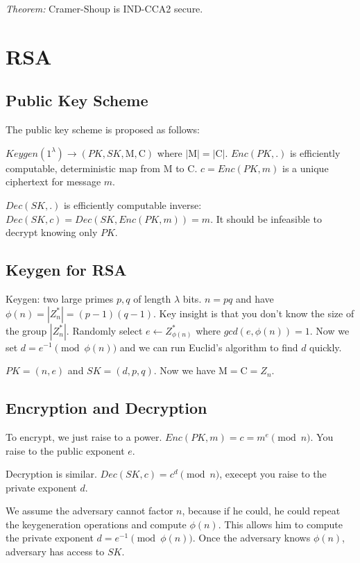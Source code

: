 \documentclass[psamsfonts]{amsart}
\begin{document}
\emph{Theorem:} Cramer-Shoup is IND-CCA2 secure.

\section{RSA}

\subsection{Public Key Scheme}

The public key scheme is proposed as follows:

$Keygen(1^\lambda) \to (PK, SK, \mathrm{M}, \mathrm{C})$ where $|\mathrm{M}| = |\mathrm{C}|$. $Enc(PK, .)$ is efficiently computable, deterministic map from $\mathrm{M}$ to $\mathrm{C}$. $c = Enc(PK, m)$ is a unique ciphertext for message $m$.

$Dec(SK,.)$ is efficiently computable inverse: $Dec(SK, c) = Dec(SK, Enc(PK, m)) = m$. It should be infeasible to decrypt knowing only $PK$. 

\subsection{Keygen for RSA}

Keygen: two large primes $p,q$ of length $\lambda$ bits. $n = pq$ and have $\phi(n) = |Z_n^*| = (p-1) (q-1)$. Key insight is that you don't know the size of the group $|Z_n^*|$. Randomly select $e \leftarrow Z_{\phi(n)}^*$ where $gcd(e, \phi(n)) = 1$. Now we set $d = e^{-1} \pmod{ \phi(n)}$ and we can run Euclid's algorithm to find $d$ quickly.

$PK = (n,e)$ and $SK = (d, p, q)$. Now we have $\mathrm{M} = \mathrm{C} = Z_n$.

\subsection{Encryption and Decryption}

To encrypt, we just raise to a power. $Enc(PK,m) = c = m^e \pmod{n}$. You raise to the public exponent $e$.

Decryption is similar. $Dec(SK, c) = c^d \pmod{n}$, execept you raise to the private exponent $d$.

We assume the adversary cannot factor $n$, because if he could, he could repeat the keygeneration operations and compute $\phi(n)$. This allows him to compute the private exponent $d = e^{-1} \pmod{\phi(n)}$. Once the adversary knows $\phi(n)$, adversary has access to $SK$.
\end{document}

